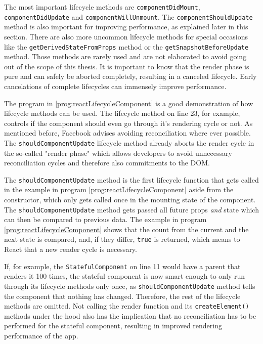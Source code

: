 The most important lifecycle methods are \texttt{component\-Did\-Mount}, \texttt{component\-Did\-Update} and \texttt{component\-Will\-Unmount}. The \texttt{componentShouldUpdate} method is also important for improving performance, as explained later in this section. There are also more uncommon lifecycle methods for special occasions like the \texttt{getDerivedStateFromProps} method or the \texttt{getSnapshotBeforeUpdate} method. Those methods are rarely used and are not elaborated to avoid going out of the scope of this thesis. It is important to know that the render phase is pure and can safely be aborted completely, resulting in a canceled lifecycle. Early cancelations of complete lifecycles can immensely improve performance.

The program in \ref{prog:reactLifecycleComponent} is a good demonstration of how lifecycle methods can be used. The lifecycle method on line 23, for example, controls if the component should even go through it's rendering cycle or not. As mentioned before, Facebook advises avoiding reconciliation where ever possible. The \texttt{shouldComponentUpdate} lifecycle method already aborts the render cycle in the so-called "render phase" which allows developers to avoid unnecessary reconciliation cycles and therefore also commitments to the DOM. 

The \texttt{shouldComponentUpdate} method is the first lifecycle function that gets called in the example in program \ref{prog:reactLifecycleComponent} aside from the constructor, which only gets called once in the mounting state of the component. The \texttt{shouldComponentUpdate} method gets passed all future props \emph{and} state which can then be compared to previous data. The example in program \ref{prog:reactLifecycleComponent} shows that the count from the current and the next state is compared, and, if they differ, \texttt{true} is returned, which means to React that a new render cycle is necessary. 

If, for example, the \texttt{StatefulComponent} on line 11 would have a parent that renders it 100 times, the stateful component is now smart enough to only run through its lifecycle methods only once, as \texttt{shouldComponentUpdate} method tells the component that nothing has changed. Therefore, the rest of the lifecycle methods are omitted. Not calling the render function and its \texttt{createElement()} methods under the hood also has the implication that no reconciliation has to be performed for the stateful component, resulting in improved rendering performance of the app.

